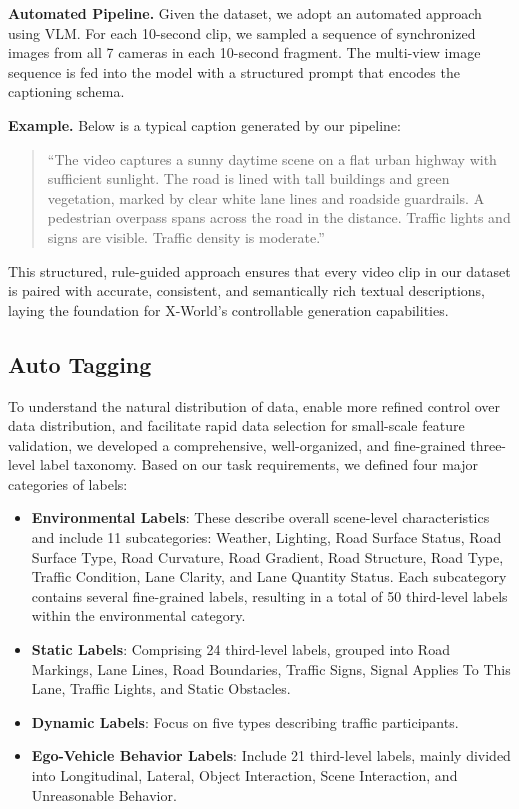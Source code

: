 \noindent\textbf{Automated Pipeline.} Given the dataset, we adopt an automated approach using VLM. For each 10-second clip, we sampled a sequence of synchronized images from all 7 cameras in each 10-second fragment. The multi-view image sequence is fed into the model with a structured prompt that encodes the captioning schema.

\noindent\textbf{Example.} Below is a typical caption generated by our pipeline:

\begin{quote}
``The video captures a sunny daytime scene on a flat urban highway with sufficient sunlight. The road is lined with tall buildings and green vegetation, marked by clear white lane lines and roadside guardrails. A pedestrian overpass spans across the road in the distance. Traffic lights and signs are visible. Traffic density is moderate.''
\end{quote}

This structured, rule-guided approach ensures that every video clip in our dataset is paired with accurate, consistent, and semantically rich textual descriptions, laying the foundation for X-World's controllable generation capabilities.



\subsection{Auto Tagging}
To understand the natural distribution of data, enable more refined control over data distribution, and facilitate rapid data selection for small-scale feature validation, we developed a comprehensive, well-organized, and fine-grained three-level label taxonomy. Based on our task requirements, we defined four major categories of labels:

\begin{itemize}
    \item \textbf{Environmental Labels}: These describe overall scene-level characteristics and include 11 subcategories: Weather, Lighting, Road Surface Status, Road Surface Type, Road Curvature, Road Gradient, Road Structure, Road Type, Traffic Condition, Lane Clarity, and Lane Quantity Status. Each subcategory contains several fine-grained labels, resulting in a total of 50 third-level labels within the environmental category.
    \item \textbf{Static Labels}: Comprising 24 third-level labels, grouped into Road Markings, Lane Lines, Road Boundaries, Traffic Signs, Signal Applies To This Lane, Traffic Lights, and Static Obstacles.
    \item \textbf{Dynamic Labels}: Focus on five types describing traffic participants.
    \item \textbf{Ego-Vehicle Behavior Labels}: Include 21 third-level labels, mainly divided into Longitudinal, Lateral, Object Interaction, Scene Interaction, and Unreasonable Behavior.
\end{itemize}

